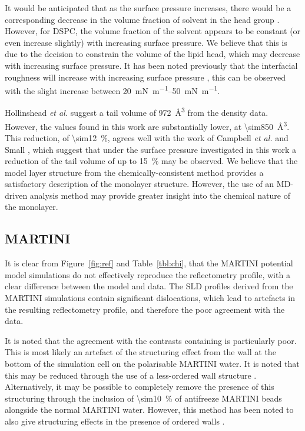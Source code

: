 \documentclass[amsmath,amssymb,twocolumn,superscriptaddress]{revtex4-1}
\begin{document}
It would be anticipated that as the surface pressure increases, there would be a corresponding decrease in the volume fraction of solvent in the head group \cite{bayerl_specular_1990}.
However, for DSPC, the volume fraction of the solvent appears to be constant (or even increase slightly) with increasing surface pressure.
We believe that this is due to the decision to constrain the volume of the lipid head, which may decrease with increasing surface pressure.
It has been noted previously that the interfacial roughness will increase with increasing surface pressure \cite{lu_aspects_1994}, this can be observed with the slight increase between \SIrange{20}{50}{\milli\newton\per\meter}.

Hollinshead \emph{et al.} \cite{hollinshead_effects_2009} suggest a tail volume of \SI{972}{\angstrom\cubed} from the density data.
However, the values found in this work are substantially lower, at \SI{\sim850}{\angstrom\cubed}.
This reduction, of \SI{\sim12}{\percent}, agrees well with the work of Campbell \emph{et al.} \cite{campbell_structure_2018} and Small \cite{small_lateral_1984}, which suggest that under the surface pressure investigated in this work a reduction of the tail volume of up to \SI{15}{\percent} may be observed.
We believe that the model layer structure from the chemically-consistent method provides a satisfactory description of the monolayer structure.
However, the use of an MD-driven analysis method may provide greater insight into the chemical nature of the monolayer.

\subsection{MARTINI}
It is clear from Figure~\ref{fig:ref} and Table~\ref{tbl:chi}, that the MARTINI potential model simulations do not effectively reproduce the reflectometry profile, with a clear difference between the model and data.
The SLD profiles derived from the MARTINI simulations contain significant dislocations, which lead to artefacts in the resulting reflectometry profile, and therefore the poor agreement with the data.

It is noted that the agreement with the contrasts containing  is particularly poor.
This is most likely an artefact of the structuring effect from the wall at the bottom of the simulation cell on the polarisable MARTINI water.
It is noted that this may be reduced through the use of a less-ordered wall structure \cite{koutsioubas_combined_2016}.
Alternatively, it may be possible to completely remove the presence of this structuring through the inclusion of \SI{\sim10}{\percent} of antifreeze MARTINI beads alongside the normal MARTINI water.
However, this method has been noted to also give structuring effects in the presence of ordered walls \cite{marrink_comment_2010}.
\end{document}
